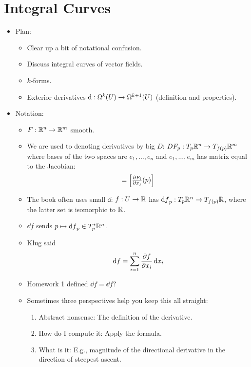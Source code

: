 \documentclass[../notes.tex]{subfiles}
\begin{document}
\section{Integral Curves}
\begin{itemize}
    \item {}Plan:
    \begin{itemize}
        \item Clear up a bit of notational confusion.
        \item Discuss integral curves of vector fields.
        \item $k$-forms.
        \item Exterior derivatives $\dd:\ome[k]{U}\to\ome[k+1]{U}$ (definition and properties).
    \end{itemize}
    \item Notation:
    \begin{itemize}
        \item $F:\R^n\to\R^m$ smooth.
        \item We are used to denoting derivatives by big $D$: $DF_p:T_p\R^n\to T_{f(p)}\R^m$ where bases of the two spaces are $e_1,\dots,e_n$ and $e_1,\dots,e_m$ has matrix equal to the Jacobian:
        \begin{equation*}
            [DF_p] =
            \begin{bmatrix}
                {\pdv{F_i}{x_j}}(p)
            \end{bmatrix}
        \end{equation*}
        \item The book often uses small $\dd$: $f:U\to\R$ has $\dd{f}_p:T_p\R^n\to T_{f(p)}\R$, where the latter set is isomorphic to $\R$.
        \item $\dd f$ sends $p\mapsto\dd{f}_p\in T_p^*\R^n$.
        \item Klug said
        \begin{equation*}
            \dd{f} = \sum_{i=1}^n\pdv{f}{x_i}\dd{x_i}
        \end{equation*}
        \item Homework 1 defined $\dd{f}=\dd f$?
        \item Sometimes three perspectives help you keep this all straight:
        \begin{enumerate}
            \item Abstract nonsense: The definition of the derivative.
            \item How do I compute it: Apply the formula.
            \item What is it: E.g., magnitude of the directional derivative in the direction of steepest ascent.

\end{enumerate}
\end{itemize}
\end{itemize}
\end{document}
